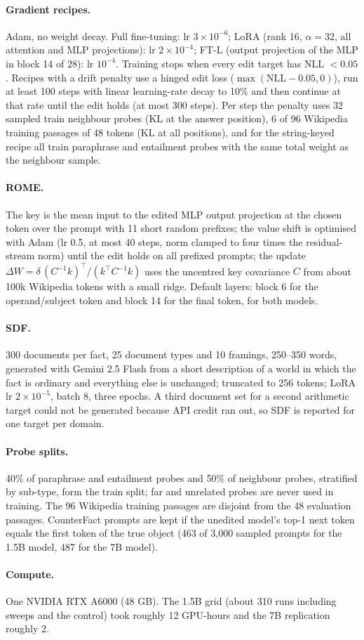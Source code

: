\paragraph{Gradient recipes.} Adam, no weight decay. Full fine-tuning: lr $3\times10^{-6}$; LoRA (rank 16, $\alpha=32$, all attention and MLP projections): lr $2\times10^{-4}$; FT-L (output projection of the MLP in block 14 of 28): lr $10^{-4}$. Training stops when every edit target has NLL $<0.05$. Recipes with a drift penalty use a hinged edit loss ($\max(\mathrm{NLL}-0.05,0)$), run at least 100 steps with linear learning-rate decay to 10\% and then continue at that rate until the edit holds (at most 300 steps). Per step the penalty uses 32 sampled train neighbour probes (KL at the answer position), 6 of 96 Wikipedia training passages of 48 tokens (KL at all positions), and for the string-keyed recipe all train paraphrase and entailment probes with the same total weight as the neighbour sample.

\paragraph{ROME.} The key is the mean input to the edited MLP output projection at the chosen token over the prompt with 11 short random prefixes; the value shift is optimised with Adam (lr 0.5, at most 40 steps, norm clamped to four times the residual-stream norm) until the edit holds on all prefixed prompts; the update $\Delta W=\delta\,(C^{-1}k)^\top/(k^\top C^{-1}k)$ uses the uncentred key covariance $C$ from about 100k Wikipedia tokens with a small ridge. Default layers: block 6 for the operand/subject token and block 14 for the final token, for both models.

\paragraph{SDF.} 300 documents per fact, 25 document types and 10 framings, 250--350 words, generated with Gemini 2.5 Flash from a short description of a world in which the fact is ordinary and everything else is unchanged; truncated to 256 tokens; LoRA lr $2\times10^{-5}$, batch 8, three epochs. A third document set for a second arithmetic target could not be generated because API credit ran out, so SDF is reported for one target per domain.

\paragraph{Probe splits.} 40\% of paraphrase and entailment probes and 50\% of neighbour probes, stratified by sub-type, form the train split; far and unrelated probes are never used in training. The 96 Wikipedia training passages are disjoint from the 48 evaluation passages. CounterFact prompts are kept if the unedited model's top-1 next token equals the first token of the true object (463 of 3{,}000 sampled prompts for the 1.5B model, 487 for the 7B model).

\paragraph{Compute.} One NVIDIA RTX A6000 (48 GB). The 1.5B grid (about 310 runs including sweeps and the control) took roughly 12 GPU-hours and the 7B replication roughly 2.
